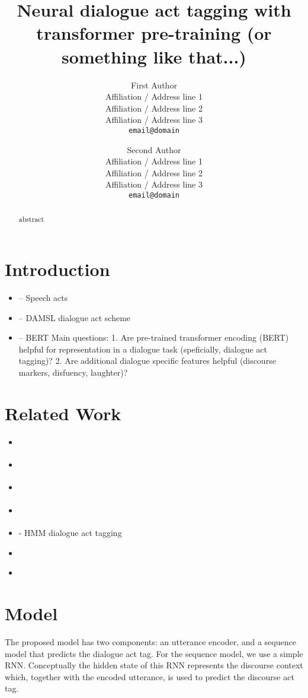 \documentclass[11pt,a4paper]{article}
\title{Neural dialogue act tagging with transformer pre-training (or something like that...)}
\author{
  First Author \\
  Affiliation / Address line 1 \\
  Affiliation / Address line 2 \\
Affiliation / Address line 3 \\
  {\tt email@domain} \\\and
  Second Author \\
  Affiliation / Address line 1 \\
  Affiliation / Address line 2 \\
  Affiliation / Address line 3 \\
  {\tt email@domain} \\
}
\date{}
\begin{document}
\maketitle

\begin{abstract}
  abstract
\end{abstract}

\section{Introduction}
\begin{itemize}
  \item \cite{austinHowThingsWords2009} -- Speech acts
  \item \cite{coreCodingDialogsDAMSL1997} -- DAMSL dialogue act scheme
  \item \cite{devlinBERTPretrainingDeep2018} -- BERT
    Main questions:
    1. Are pre-trained transformer encoding (BERT) helpful for representation in a dialogue task (speficially, dialogue act tagging)?
    2. Are additional dialogue specific features helpful (discourse markers, disfuency, laughter)?
\end{itemize}

\section{Related Work}
\begin{itemize}
  \item \cite{cerisaraEffectsUsingWord2vec2017}
  \item \cite{kalchbrennerRecurrentConvolutionalNeural2013}
  \item \cite{pragstVectorRepresentationUtterances2018}
  \item \cite{sordoniNeuralNetworkApproach2015}
  \item \cite{stolckeDialogueActModeling2000} - HMM dialogue act tagging
  \item \cite{khanpourDialogueActClassification}
  \item \cite{tranPreservingDistributionalInformation2017}
\end{itemize}

\section{Model}
The proposed model has two components: an utterance encoder, and a sequence model that predicts the dialogue act tag.
For the sequence model, we use a simple RNN.
Conceptually the hidden state of this RNN represents the discourse context which, 
together with the encoded utterance, is used to predict the discourse act tag.
\end{document}
